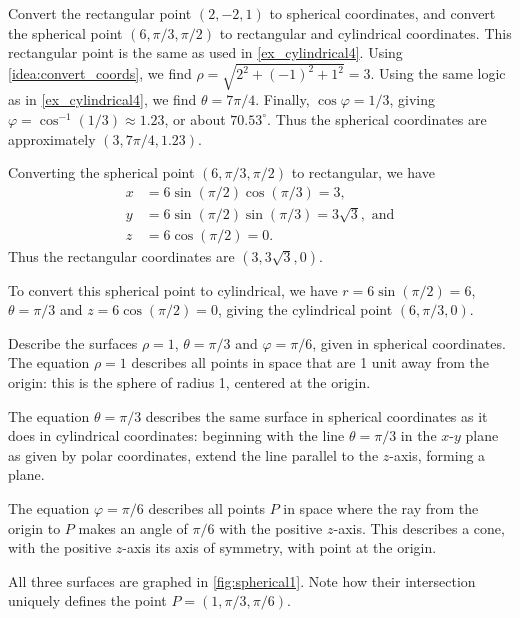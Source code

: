 \begin{example}\label{ex_spherical4}%
Convert the rectangular point $(2,-2,1)$ to spherical coordinates, and convert the spherical point $(6,\pi/3,\pi/2)$ to rectangular and cylindrical coordinates.
\solution
This rectangular point is the same as used in \autoref{ex_cylindrical4}. Using \autoref{idea:convert_coords}, we find $\rho = \sqrt{2^2+(-1)^2+1^2} = 3$. Using the same logic as in \autoref{ex_cylindrical4}, we find $\theta = 7\pi/4$. Finally, $\cos\varphi = 1/3$, giving $\varphi = \cos^{-1}(1/3) \approx 1.23$, or about $70.53^\circ$. Thus the spherical coordinates are approximately $(3,7\pi/4,1.23)$.

Converting the spherical point $(6,\pi/3,\pi/2)$ to rectangular, we have
\begin{align*}
 x &= 6\sin(\pi/2)\cos(\pi/3) = 3,\\
 y &= 6\sin(\pi/2)\sin(\pi/3) = 3\sqrt{3},\text{ and}\\
 z &= 6\cos(\pi/2) = 0.
\end{align*}
Thus the rectangular coordinates are $(3,3\sqrt{3},0)$.

To convert this spherical point to cylindrical, we have $r = 6\sin(\pi/2) = 6$, $\theta = \pi/3$ and $z = 6\cos(\pi/2) =0$, giving the cylindrical point $(6,\pi/3,0)$.
\end{example}

\begin{example}\label{ex_spherical1}%
Describe the surfaces $\rho=1$, $\theta = \pi/3$ and $\varphi = \pi/6$, given in spherical coordinates.
%
%
\solution
The equation $\rho = 1$ describes all points in space that are 1 unit away from the origin: this is the sphere of radius 1, centered at the origin.

The equation $\theta = \pi/3$ describes the same surface in spherical coordinates as it does in cylindrical coordinates: beginning with the line $\theta = \pi/3$ in the $x$-$y$ plane as given by polar coordinates, extend the line parallel to the $z$-axis, forming a plane.

The equation $\varphi=\pi/6$ describes all points $P$ in space where the ray from the origin to $P$ makes an angle of $\pi/6$ with the positive $z$-axis. This describes a cone, with the positive $z$-axis its axis of symmetry, with point at the origin.

All three surfaces are graphed in \autoref{fig:spherical1}. Note how their intersection uniquely defines the point $P=(1,\pi/3,\pi/6)$.
\end{example}

